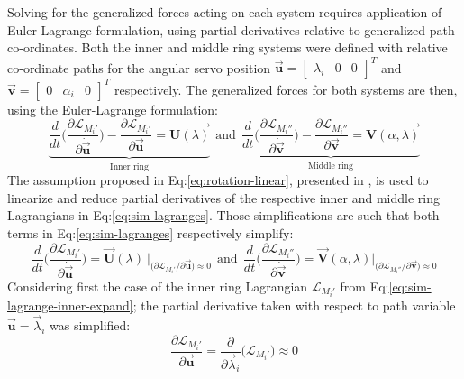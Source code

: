 Solving for the generalized forces acting on each system requires application of Euler-Lagrange formulation, using partial derivatives relative to generalized path co-ordinates. Both the inner and middle ring systems were defined with relative co-ordinate paths for the angular servo position $\vec{\mathbf{u}}=\begin{bmatrix}\lambda_i&0&0\end{bmatrix}^T$ and $\vec{\mathbf{v}}=\begin{bmatrix}0&\alpha_i&0\end{bmatrix}^T$ respectively. The generalized forces for both systems are then, using the Euler-Lagrange formulation:
\begin{equation}\label{eq:sim-lagranges}
\underbrace{\frac{d}{dt}\bigg(\frac{\partial\mathcal{L}_{M_i'}}{\partial\dot{\vec{\mathbf{u}}}}\bigg)-\frac{\partial\mathcal{L}_{M_i'}}{\partial\vec{\mathbf{u}}}=\vec{\mathbf{U}(\lambda)}}_{\text{Inner ring}}~~\text{and}~~\underbrace{\frac{d}{dt}\bigg(\frac{\partial\mathcal{L}_{M_i''}}{\partial\dot{\vec{\mathbf{v}}}}\bigg)-\frac{\partial\mathcal{L}_{M_i''}}{\partial\vec{\mathbf{v}}}=\vec{\mathbf{V}(\alpha,\lambda)}}_{\text{Middle ring}}
\end{equation}
The assumption proposed in Eq:\ref{eq:rotation-linear}, presented in \cite{rotationlinearize}, is used to linearize and reduce partial derivatives of the respective inner and middle ring Lagrangians in Eq:\ref{eq:sim-lagranges}. Those simplifications are such that both terms in Eq:\ref{eq:sim-lagranges} respectively simplify:
\begin{equation}\label{eq:sim-lagranges-linear}
\frac{d}{dt}\bigg(\frac{\partial\mathcal{L}_{M_i'}}{\partial\dot{\vec{\mathbf{u}}}}\bigg)=\vec{\mathbf{U}}(\lambda)~\Big|_{\big(\partial\mathcal{L}_{M_i'}/\partial\vec{\mathbf{u}}\big)\approx 0}~~\text{and}~~\frac{d}{dt}\bigg(\frac{\partial\mathcal{L}_{M_i''}}{\partial\dot{\vec{\mathbf{v}}}}\bigg)=\vec{\mathbf{V}}(\alpha,\lambda)\Big|_{\big(\partial\mathcal{L}_{M_i''}/\partial\vec{\mathbf{v}}\big)\approx 0}
\end{equation}
Considering first the case of the inner ring Lagrangian $\mathcal{L}_{M_i'}$ from Eq:\ref{eq:sim-lagrange-inner-expand}; the partial derivative taken with respect to path variable $\vec{\mathbf{u}}=\vec{\lambda}_i$ was simplified:
\begin{equation}\label{eq:sim-lagrange-inner-simple}
\frac{\partial\mathcal{L}_{M_i'}}{\partial\vec{\mathbf{u}}}=\frac{\partial}{\partial\vec{\lambda}_i}\big(\mathcal{L}_{M_i'}\big)\approx 0
\end{equation}
